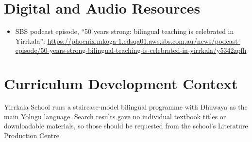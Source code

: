 \documentclass[12pt]{article}
\begin{document}
\section{Digital and Audio Resources}
\begin{itemize}
\item SBS podcast episode, ``50 years strong: bilingual teaching is celebrated in Yirrkala'': \url{https://phoenix.mkoga-1.edsqa01.aws.sbs.com.au/news/podcast-episode/50-years-strong-bilingual-teaching-is-celebrated-in-yirrkala/y5342zpfh}
\end{itemize}

\section{Curriculum Development Context}
Yirrkala School runs a staircase-model bilingual programme with Dhuwaya as the main Yolngu language. Search results gave no individual textbook titles or downloadable materials, so those should be requested from the school's Literature Production Centre.
\end{document}
